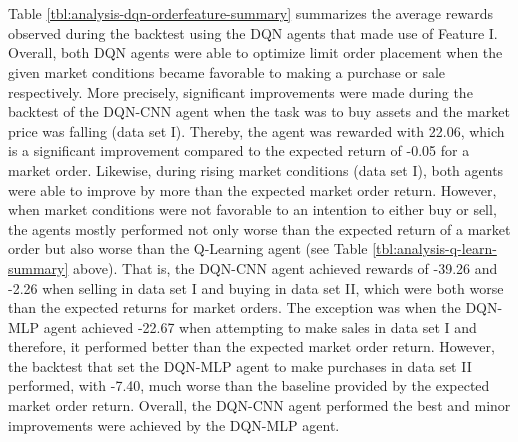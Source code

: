 \\
\\
Table \ref{tbl:analysis-dqn-orderfeature-summary} summarizes the average rewards observed during the backtest using the DQN agents that made use of Feature I.
Overall, both DQN agents were able to optimize limit order placement when the given market conditions became favorable to making a purchase or sale respectively.
More precisely, significant improvements were made during the backtest of the DQN-CNN agent when the task was to buy assets and the market price was falling (data set I). 
Thereby, the agent was rewarded with 22.06, which is a significant improvement compared to the expected return of -0.05 for a market order.
Likewise, during rising market conditions (data set I), both agents were able to improve by more than the expected market order return.
However, when market conditions were not favorable to an intention to either buy or sell, the agents mostly performed not only worse than the expected return of a market order but also worse than the Q-Learning agent (see Table \ref{tbl:analysis-q-learn-summary} above).
That is, the DQN-CNN agent achieved rewards of -39.26 and -2.26 when selling in data set I and buying in data set II, which were both worse than the expected returns for market orders.
The exception was when the DQN-MLP agent achieved -22.67 when attempting to make sales in data set I and therefore, it performed better than the expected market order return.
However, the backtest that set the DQN-MLP agent to make purchases in data set II performed, with -7.40, much worse than the baseline provided by the expected market order return.
Overall, the DQN-CNN agent performed the best and minor improvements were achieved by the DQN-MLP agent.

